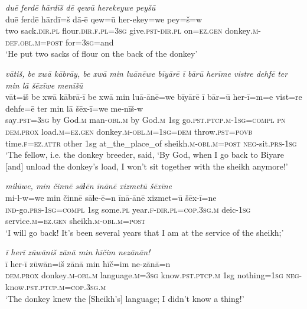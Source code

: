 \ea \label{HB.61}
\textit{duē ferdē hārdīš dē qewū herekeywe peyšū} \\ 
\gll duē ferdē hārdī=š dā-ē qew=ū her-ekey=we pey=š=w \\ 
 two sack\textsc{.dir}\textsc{.pl} flour\textsc{.dir}\textsc{\textsc{.f}}\textsc{.pl}\textsc{=3sg} give\textsc{.pst}\textsc{-dir}\textsc{.pl} on\textsc{=ez}\textsc{.gen} donkey\textsc{.m}\textsc{-def}\textsc{.obl}\textsc{.m}\textsc{=\textsc{post}} for\textsc{=3sg}=and \\ 
\glt `He put two sacks of flour on the back of the donkey'
\z 
 
\ea \label{HB.67}
\textit{vātiš, be xwā kābrāy, be xwā min luānēwe bīyārē ī bārū herīme vistre dehfē ter min lā šēxīwe menīšū} \\ 
\gll vāt=iš be xwā kābrā-ī be xwā min luā-ānē=we bīyārē ī bār=ū her-ī=m=e vist=re dehfe=ē ter min lā šēx-ī=we me-nīš-w \\ 
 say\textsc{.pst}\textsc{=3sg} by God\textsc{.m} man\textsc{-obl}\textsc{.m} by God\textsc{.m} 1sg go\textsc{.pst}\textsc{.ptcp}\textsc{.m}\textsc{-1sg}\textsc{=\textsc{compl}} \textsc{pn} \textsc{dem.prox} load\textsc{.m}\textsc{=ez}\textsc{.gen} donkey\textsc{.m}\textsc{-obl}\textsc{.m}\textsc{=1sg}\textsc{=dem} throw\textsc{.pst}\textsc{=\textsc{povb}} time\textsc{\textsc{.f}}\textsc{=ez}.\textsc{attr} other 1sg at\_the\_place\_of sheikh\textsc{.m}\textsc{-obl}\textsc{.m}\textsc{=\textsc{post}} \textsc{neg-}sit\textsc{.prs}\textsc{-1sg} \\ 
\glt `The fellow, i.e. the donkey breeder, said, ‘By God, when I go back to Biyare [and] unload the donkey’s load, I won’t sit together with the sheikh anymore!'
\z 
 
\ea \label{HB.68}
\textit{milūwe, min činnē sāɫēn īnānē xizmetū šēxīne} \\ 
\gll mi-l-w=we min činnē sāɫe-ē=n īnā-ānē xizmet=ū šēx-ī=ne \\ 
 \textsc{ind-}go\textsc{.prs}\textsc{-1sg}\textsc{=\textsc{compl}} 1sg some\textsc{.pl} year\textsc{\textsc{.f}}\textsc{-dir}\textsc{.pl}\textsc{=cop}\textsc{.3sg}\textsc{.m} deic\textsc{-1sg} service\textsc{.m}\textsc{=ez}\textsc{.gen} sheikh\textsc{.m}\textsc{-obl}\textsc{.m}\textsc{=\textsc{post}} \\ 
\glt `I will go back! It’s been several years that I am at the service of the sheikh;'
\z 
 
\ea \label{HB.71}
\textit{ī herī zūwāniš zānā min hīčim nezānān!} \\ 
\gll ī her-ī zūwān=iš zānā min hīč=im ne-zānā=n \\ 
 \textsc{dem.prox} donkey\textsc{.m}\textsc{-obl}\textsc{.m} language\textsc{.m}\textsc{=3sg} know\textsc{.pst}\textsc{.ptcp}\textsc{.m} 1sg nothing\textsc{=1sg} \textsc{neg-}know\textsc{.pst}\textsc{.ptcp}\textsc{.m}\textsc{=cop}\textsc{.3sg}\textsc{.m} \\ 
\glt `The donkey knew the [Sheikh’s] language; I didn’t know a thing!'
\z 
 
